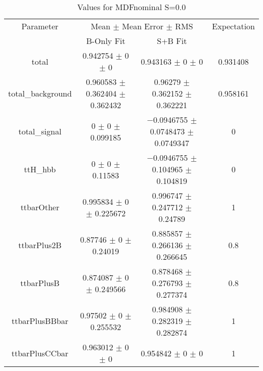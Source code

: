 \begin{table}
\centering
\caption{Values for MDFnominal S=0.0}
\begin{tabular}{cccc}
\toprule
Parameter & \multicolumn{2}{c}{Mean $\pm$ Mean Error $\pm$ RMS} & Expectation\\
 & B-Only Fit & S+B Fit & \\
\midrule
total & \num{0.942754} $\pm$ \num{0} $\pm$ \num{0} & \num{0.943163} $\pm$ \num{0} $\pm$ \num{0} & \num{0.931408}\\
total\_background & \num{0.960583} $\pm$ \num{0.362404} $\pm$ \num{0.362432} & \num{0.96279} $\pm$ \num{0.362152} $\pm$ \num{0.362221} & \num{0.958161}\\
total\_signal & \num{0} $\pm$ \num{0} $\pm$ \num{0.099185} & \num{-0.0946755} $\pm$ \num{0.0748473} $\pm$ \num{0.0749347} & \num{0}\\
ttH\_hbb & \num{0} $\pm$ \num{0} $\pm$ \num{0.11583} & \num{-0.0946755} $\pm$ \num{0.104965} $\pm$ \num{0.104819} & \num{0}\\
ttbarOther & \num{0.995834} $\pm$ \num{0} $\pm$ \num{0.225672} & \num{0.996747} $\pm$ \num{0.247712} $\pm$ \num{0.24789} & \num{1}\\
ttbarPlus2B & \num{0.87746} $\pm$ \num{0} $\pm$ \num{0.24019} & \num{0.885857} $\pm$ \num{0.266136} $\pm$ \num{0.266645} & \num{0.8}\\
ttbarPlusB & \num{0.874087} $\pm$ \num{0} $\pm$ \num{0.249566} & \num{0.878468} $\pm$ \num{0.276793} $\pm$ \num{0.277374} & \num{0.8}\\
ttbarPlusBBbar & \num{0.97502} $\pm$ \num{0} $\pm$ \num{0.255532} & \num{0.984908} $\pm$ \num{0.282319} $\pm$ \num{0.282874} & \num{1}\\
ttbarPlusCCbar & \num{0.963012} $\pm$ \num{0} $\pm$ \num{0} & \num{0.954842} $\pm$ \num{0} $\pm$ \num{0} & \num{1}\\
\bottomrule
\end{tabular}
\end{table}